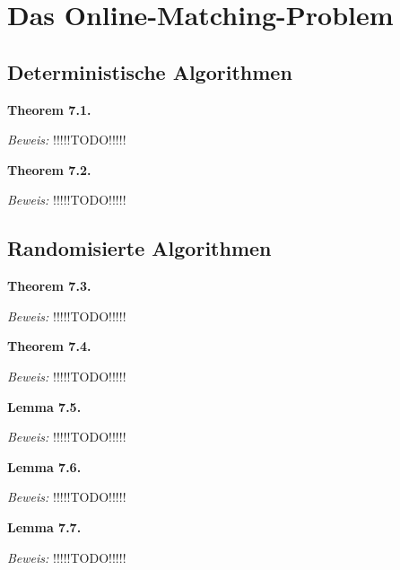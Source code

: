 \chapter{Das Online-Matching-Problem}

\section{Deterministische Algorithmen}

\textbf{Theorem 7.1.} 

\textit{Beweis:} !!!!!TODO!!!!!

\textbf{Theorem 7.2.} 

\textit{Beweis:} !!!!!TODO!!!!!

\section{Randomisierte Algorithmen}

\textbf{Theorem 7.3.} 

\textit{Beweis:} !!!!!TODO!!!!!

\textbf{Theorem 7.4.} 

\textit{Beweis:} !!!!!TODO!!!!!

\textbf{Lemma 7.5.} 

\textit{Beweis:} !!!!!TODO!!!!!

\textbf{Lemma 7.6.} 

\textit{Beweis:} !!!!!TODO!!!!!

\textbf{Lemma 7.7.} 

\textit{Beweis:} !!!!!TODO!!!!!

